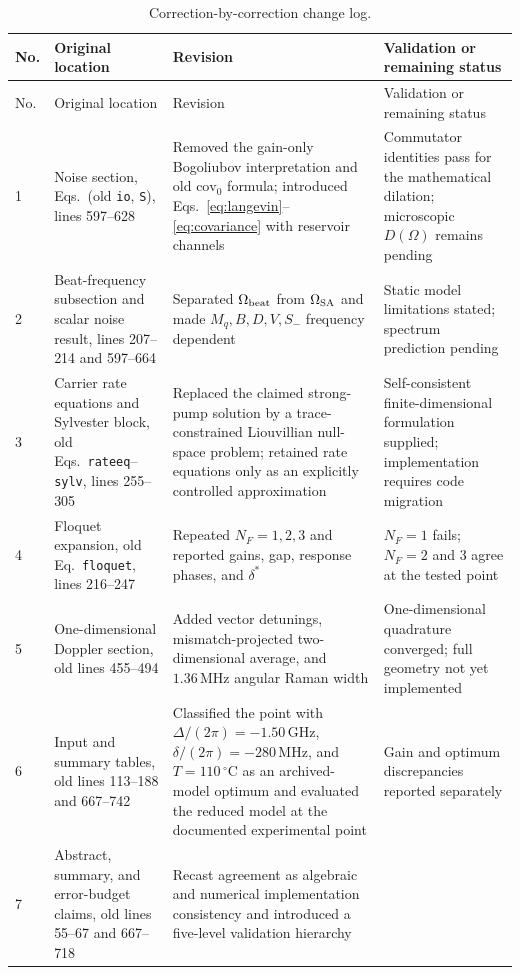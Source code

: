 \documentclass[11pt,a4paper]{article}
\newcommand{\GHz}{\,\mathrm{GHz}}
\newcommand{\MHz}{\,\mathrm{MHz}}
\newcommand{\degC}{\,^{\circ}\mathrm C}
\begin{document}
\begin{longtable}{C{0.65cm}L{4.2cm}L{5.2cm}L{4.3cm}}
\caption{Correction-by-correction change log.}
\label{tab:changelog}\\
\toprule
No. & Original location & Revision & Validation or remaining status\\
\midrule
\endfirsthead
\toprule
No. & Original location & Revision & Validation or remaining status\\
\midrule
{} & Noise section, Eqs.~(old \texttt{io}, \texttt{S}), lines 597--628 &
Removed the gain-only Bogoliubov interpretation and old
$\mathrm{cov}_0$ formula; introduced Eqs.~\eqref{eq:langevin}--%
\eqref{eq:covariance} with reservoir channels &
Commutator identities pass for the mathematical dilation;
microscopic $D(\Omega)$ remains pending\\
2 & Beat-frequency subsection and scalar noise result, lines 207--214 and
597--664 &
Separated $\Omega_{\rm beat}$ from $\Omega_{\rm SA}$ and made
$M_q,B,D,V,S_-$ frequency dependent &
Static model limitations stated; spectrum prediction pending\\
3 & Carrier rate equations and Sylvester block, old
Eqs.~\texttt{rateeq}--\texttt{sylv}, lines 255--305 &
Replaced the claimed strong-pump solution by a trace-constrained Liouvillian
null-space problem; retained rate equations only as an explicitly controlled
approximation &
Self-consistent finite-dimensional formulation supplied; implementation
requires code migration\\
4 & Floquet expansion, old Eq.~\texttt{floquet}, lines 216--247 &
Repeated $N_F=1,2,3$ and reported gains, gap, response phases, and
$\delta^*$ &
$N_F=1$ fails; $N_F=2$ and 3 agree at the tested point\\
5 & One-dimensional Doppler section, old lines 455--494 &
Added vector detunings, mismatch-projected two-dimensional average, and
$1.36\MHz$ angular Raman width &
One-dimensional quadrature converged; full geometry not yet implemented\\
6 & Input and summary tables, old lines 113--188 and 667--742 &
Classified the point with $\Delta/(2\pi)=-1.50\GHz$,
$\delta/(2\pi)=-280\MHz$, and $T=110\degC$ as an archived-model
optimum and evaluated the reduced model at the documented experimental point &
Gain and optimum discrepancies reported separately\\
7 & Abstract, summary, and error-budget claims, old lines 55--67 and
667--718 &
Recast agreement as algebraic and numerical implementation consistency and
introduced a five-level validation hierarchy &

\end{longtable}
\end{document}

